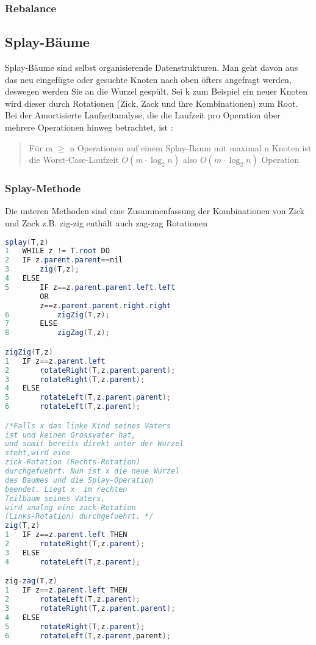 \documentclass[jou,apacite]{apa6}
\begin{document}
\subsubsection{Rebalance}

\subsection{Splay-Bäume}
Splay-Bäume sind selbst organisierende Datenstrukturen. Man geht davon aus das neu eingefügte oder gesuchte Knoten nach oben öfters angefragt werden, deswegen werden Sie an die Wurzel gespült. Sei k zum Beispiel ein neuer Knoten wird dieser durch Rotationen (Zick, Zack und ihre Kombinationen) zum  Root.
Bei der Amortisierte Laufzeitanalyse, die die Laufzeit pro Operation über mehrere Operationen hinweg betrachtet, ist :
\begin{quote}
    Für m $\geq$ n Operationen auf einem Splay-Baum mit maximal n Knoten ist die Worst-Case-Laufzeit $O(m \cdot\log_2 n)$ also $O(m\cdot\log_2 n)$ Operation
\end{quote}
\subsubsection{Splay-Methode}
Die unteren Methoden sind eine Zusammenfassung der Kombinationen von Zick und Zack  z.B. zig-zig enthält auch zag-zag Rotationen
\begin{lstlisting}[language=java]
splay(T,z)
1   WHILE z != T.root DO
2   IF z.parent.parent==nil 
3       zig(T,z);
4   ELSE
5       IF z==z.parent.parent.left.left 
        OR 
        z==z.parent.parent.right.right 
6           zigZig(T,z);
7       ELSE
8           zigZag(T,z);

zigZig(T,z)
1   IF z==z.parent.left 
2       rotateRight(T,z.parent.parent);
3       rotateRight(T,z.parent);
4   ELSE
5       rotateLeft(T,z.parent.parent);
6       rotateLeft(T,z.parent);

/*Falls x das linke Kind seines Vaters 
ist und keinen Grossvater hat,
und somit bereits direkt unter der Wurzel 
steht,wird eine 
zick-Rotation (Rechts-Rotation) 
durchgefuehrt. Nun ist x die neue Wurzel
des Baumes und die Splay-Operation
beendet. Liegt x  im rechten 
Teilbaum seines Vaters,
wird analog eine zack-Rotation 
(Links-Rotation) durchgefuehrt. */
zig(T,z)
1   IF z==z.parent.left THEN
2       rotateRight(T,z.parent);
3   ELSE
4       rotateLeft(T,z.parent);

zig-zag(T,z)
1   IF z==z.parent.left THEN
2       rotateLeft(T,z.parent);
3       rotateRight(T,z.parent.parent);
4   ELSE
5       rotateRight(T,z.parent);
6       rotateLeft(T,z.parent,parent);
\end{lstlisting}
\end{document}
